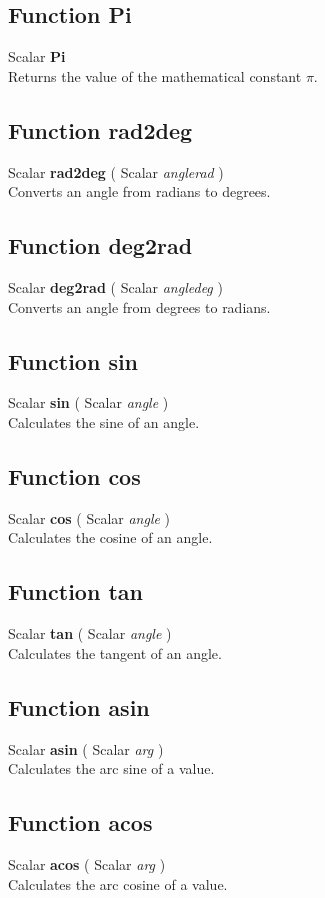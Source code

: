 \subsection{Function Pi \label{F:Pi}}
Scalar \textbf{Pi} \\
Returns the value of the mathematical constant $\pi$.

\subsection{Function rad2deg \label{F:rad2deg}}
Scalar \textbf{rad2deg} ( Scalar \textit{anglerad} ) \\
Converts an angle from radians to degrees.

\subsection{Function deg2rad \label{F:deg2rad}}
Scalar \textbf{deg2rad} ( Scalar \textit{angledeg} ) \\
Converts an angle from degrees to radians.

\subsection{Function sin \label{F:sin}}
Scalar \textbf{sin} ( Scalar \textit{angle} ) \\
Calculates the sine of an angle.

\subsection{Function cos \label{F:cos}}
Scalar \textbf{cos} ( Scalar \textit{angle} ) \\
Calculates the cosine of an angle.

\subsection{Function tan \label{F:tan}}
Scalar \textbf{tan} ( Scalar \textit{angle} ) \\
Calculates the tangent of an angle.

\subsection{Function asin \label{F:asin}}
Scalar \textbf{asin} ( Scalar \textit{arg} ) \\
Calculates the arc sine of a value.

\subsection{Function acos \label{F:acos}}
Scalar \textbf{acos} ( Scalar \textit{arg} ) \\
Calculates the arc cosine of a value.

